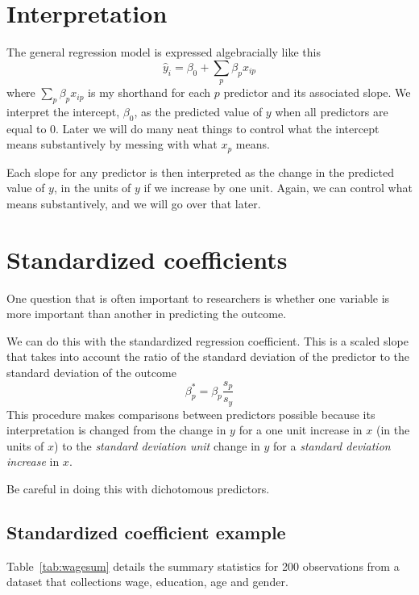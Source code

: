 \section{Interpretation}
The general regression model is expressed algebracially like this
\begin{equation}
\hat{y}_i=\beta_0+\sum_p\beta_px_{ip}
\end{equation}
where $\sum_p\beta_px_{ip}$ is my shorthand for each $p$ predictor and its associated slope. We interpret the intercept, $\beta_0$, as the predicted value of $y$ when all predictors are equal to 0. Later we will do many neat things to control what the intercept means substantively by messing with what $x_p$ means.

Each slope for any predictor is then interpreted as the change in the predicted value of $y$, in the units of $y$ if we increase by one unit. Again, we can control what means substantively, and we will go over that later.


\section{Standardized coefficients}
One question that is often important to researchers is whether one variable is more important than another in predicting the outcome.

We can do this with the standardized regression coefficient. This is a scaled slope that takes into account the ratio of the standard deviation of the predictor to the standard deviation of the outcome
\begin{equation}
\beta_p^*=\beta_p\frac{s_p}{s_y}
\end{equation}
This procedure makes comparisons between predictors possible because its interpretation is changed from the change in $y$ for a one unit increase in $x$ (in the units of $x$) to the {\it standard deviation unit} change in $y$ for a {\it standard deviation increase} in $x$.

Be careful in doing this with dichotomous predictors.

\subsection{Standardized coefficient example}
Table~\ref{tab:wagesum} details the summary statistics for 200 observations from a dataset that collections wage, education, age and gender.

